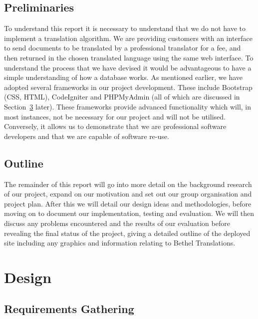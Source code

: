 \documentclass{l3proj}
\begin{document}
\section{Preliminaries}
To understand this report it is necessary to understand that we do not have to
implement a translation algorithm. We are providing customers with an interface
to send documents to be translated by a professional translator for a fee, and
then returned in the chosen translated language using the same web interface. To
understand the process that we have devised it would be advantageous to have a
simple understanding of how a database works. As mentioned earlier, we have
adopted several frameworks in our project development. These include Bootstrap
(CSS, HTML), CodeIgniter and PHPMyAdmin (all of which are discussed in
Section~\ref{chap:design} later). These frameworks provide advanced
functionality which will, in most instances, not be necessary for our project
and will not be utilised. Conversely, it allows us to demonstrate that we are
professional software developers and that we are capable of software re-use.

\section{Outline}
The remainder of this report will go into more detail on the background research
of our project, expand on our motivation and set out our group organisation and
project plan. After this we will detail our design ideas and methodologies,
before moving on to document our implementation, testing and evaluation. We will
then discuss any problems encountered and the results of our evaluation before
revealing the final status of the project, giving a detailed outline of the
deployed site including any graphics and information relating to Bethel
Translations.
 

\chapter{Design}
\label{chap:design}
\section{Requirements Gathering}
\end{document}
